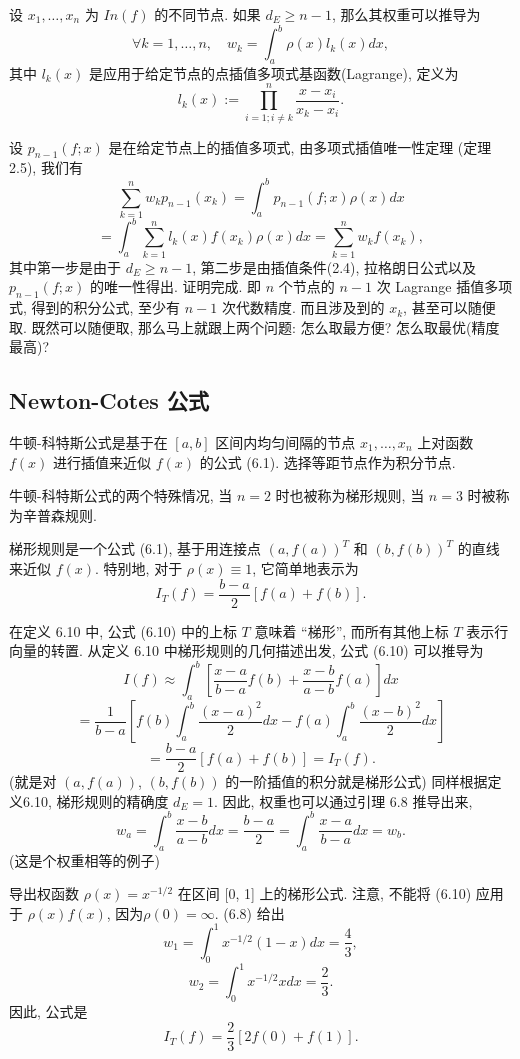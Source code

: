 \documentclass[a4paper]{ctexart}
\newcommand{\hl}[1]
{\noindent {\bf {#1}}}
\begin{document}
{\hl{引理6.8} 设 $x_1, \ldots, x_n$ 为 $In(f)$ 的不同节点. 如果 $d_E \geq n - 1$, 
那么其权重可以推导为
\[ 
\forall k = 1, \ldots, n, \quad w_k = \int_{a}^{b} \rho(x)l_k(x)dx, 
\]
其中 $l_k(x)$ 是应用于给定节点的点插值多项式基函数(Lagrange), 定义为
\[ 
l_k(x) := \prod_{i=1;i \neq k}^{n} \frac{x - x_i}{x_k - x_i}. 
\]

\hl{证明} 设 $p_{n-1}(f; x)$ 是在给定节点上的插值多项式, 由多项式插值唯一性定理 (定理2.5), 我们有
\[ 
\sum_{k = 1}^{n} w_k p_{n-1}(x_k) = \int_{a}^{b} p_{n-1}(f; x) \rho(x) dx 
\]
\[ 
= \int_{a}^{b} \sum_{k=1}^{n} l_k(x) f(x_k) \rho(x) dx = \sum_{k=1}^{n} w_k f(x_k), 
\]
其中第一步是由于 $d_E \geq n - 1$, 第二步是由插值条件(2.4), 拉格朗日公式以及 $p_{n-1}(f; x)$ 的唯一性得出. 
证明完成. 即 $n$ 个节点的 $n - 1$ 次 Lagrange 插值多项式, 得到的积分公式, 至少有 $n - 1$ 次代数精度. 
而且涉及到的 $x_k$, 甚至可以随便取. 既然可以随便取, 那么马上就跟上两个问题: 怎么取最方便? 怎么取最优(精度最高)? 

\subsection{Newton-Cotes 公式}

\hl{定义6.9} 牛顿-科特斯公式是基于在 $[a, b]$ 区间内均匀间隔的节点 
$x_1, \ldots, x_n$ 上对函数 $f(x)$ 进行插值来近似 $f(x)$ 的公式 (6.1).
选择等距节点作为积分节点. 

牛顿-科特斯公式的两个特殊情况, 当 $n = 2$ 时也被称为梯形规则, 当 $n = 3$ 时被称为辛普森规则.

\hl{定义6.10} 梯形规则是一个公式 (6.1), 基于用连接点 $(a, f(a))^T$ 和 $(b, f(b))^T$ 
的直线来近似 $f(x)$. 特别地, 对于 $\rho(x) \equiv 1$, 它简单地表示为
\[ 
I_T(f) = \frac{b - a}{2} [f(a) + f(b)]. 
\]

在定义 6.10 中, 公式 (6.10) 中的上标 $T$ 意味着 ``梯形'', 
而所有其他上标 $T$ 表示行向量的转置. 从定义 6.10 中梯形规则的几何描述出发, 公式 (6.10) 可以推导为
\[ 
I(f) \approx \int_{a}^{b} \left[ \frac{x - a}{b - a} f(b) + \frac{x - b}{a - b} f(a) \right] dx 
\]
\[ 
= \frac{1}{b - a} 
\left[ f(b) \int_{a}^{b} \frac{(x - a)^2}{2} dx - f(a) \int_{a}^{b} \frac{(x - b)^2}{2} dx \right] 
\]
\[ 
= \frac{b - a}{2} [f(a) + f(b)] = I_T(f). 
\]
(就是对 $(a, f(a))$, $(b, f(b))$ 的一阶插值的积分就是梯形公式)
同样根据定义6.10, 梯形规则的精确度 $d_E = 1$. 因此, 权重也可以通过引理 6.8 推导出来,
\[ 
w_a = \int_{a}^{b} \frac{x - b}{a - b} dx 
= \frac{b - a}{2} = \int_{a}^{b} \frac{x - a}{b - a} dx = w_b. 
\]
(这是个权重相等的例子)

\hl{例6.11} 导出权函数 $\rho(x) = x^{-1/2}$ 在区间 [0, 1]
上的梯形公式. 注意, 不能将 (6.10) 应用于 $\rho(x)f(x)$, 
因为$\rho(0) = \infty$. (6.8) 给出
\[ 
w_1 = \int_{0}^{1} x^{-1/2} (1 - x) dx = \frac{4}{3}, 
\]
\[ 
w_2 = \int_{0}^{1} x^{-1/2} x dx = \frac{2}{3}. 
\]
因此, 公式是
\[ 
I_T(f) = \frac{2}{3} [2f(0) + f(1)]. 
\] 

}
\end{document}
